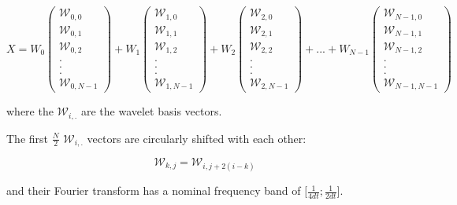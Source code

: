 \documentclass[main.tex]{subfiles}
\begin{document}
\begin{equation}
X = W_0 \begin{pmatrix} \mathcal{W}_{0 , 0} \\ \mathcal{W}_{0 , 1} \\ \mathcal{W}_{0 , 2} \\ . \\ . \\ . \\ \mathcal{W}_{0 , N - 1} \end{pmatrix}
+ W_1 \begin{pmatrix} \mathcal{W}_{1 , 0} \\ \mathcal{W}_{1 , 1} \\ \mathcal{W}_{1 , 2} \\ . \\ . \\ . \\ \mathcal{W}_{1 , N - 1} \end{pmatrix}
+ W_2 \begin{pmatrix} \mathcal{W}_{2 , 0} \\ \mathcal{W}_{2 , 1} \\ \mathcal{W}_{2 , 2} \\ . \\ . \\ . \\ \mathcal{W}_{2 , N - 1} \end{pmatrix}
+ ... + W_{N - 1} \begin{pmatrix} \mathcal{W}_{N - 1 , 0} \\ \mathcal{W}_{N - 1 , 1} \\ \mathcal{W}_{N - 1 , 2} \\ . \\ . \\ . \\ \mathcal{W}_{N - 1 , N - 1} \end{pmatrix}
\end{equation}

where the $\mathcal{W}_{i , .}$ are the wavelet basis vectors.

The first $\frac{N}{2}$ $\mathcal{W}_{i , .}$ vectors are circularly shifted with each other:

\begin{equation}
\mathcal{W}_{k , j} = \mathcal{W}_{i , j + 2 \left( i - k \right)}
\end{equation}

and their Fourier transform has a nominal frequency band of $\lbrack \frac{1}{4 dt} ; \frac{1}{2 dt} \rbrack$.
\end{document}
